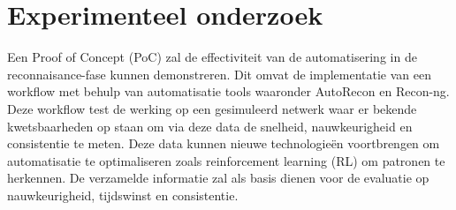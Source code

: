 \section{Experimenteel onderzoek}

Een Proof of Concept (PoC) zal de effectiviteit van de automatisering in de reconnaisance-fase kunnen demonstreren.
Dit omvat de implementatie van een workflow met behulp van automatisatie tools waaronder AutoRecon en Recon-ng. 
Deze workflow test de werking op een gesimuleerd netwerk waar er bekende kwetsbaarheden op staan om via deze data de snelheid,
nauwkeurigheid en consistentie te meten. Deze data kunnen nieuwe technologieën voortbrengen om automatisatie te optimaliseren
zoals reinforcement learning (RL) om patronen te herkennen.
De verzamelde informatie zal als basis dienen voor de evaluatie op nauwkeurigheid, tijdswinst en consistentie.







